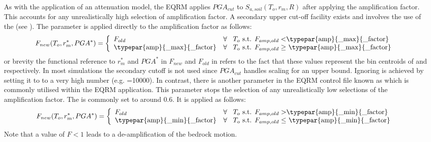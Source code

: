 As with the application of an attenuation model, the EQRM applies
$PGA_{cut}$ to $S_{a,soil}(T_o,r_m,R)$ after applying the
amplification factor. This accounts for any unrealistically high
selection of amplification factor. A secondary upper cut-off
facility exists and involves the use of the
(see ).
The  parameter is applied directly to
the amplification factor as follows:
\begin{equation}
\label{eq:regolith-maxampfactor}
F_{new}(T_o,r_m^*,PGA^*) = \left \{ \begin{array}{ll} F_{old} & \textrm{$\forall$ \hspace{0.2em} $T_o$ s.t. $F_{amp,old}<$\typepar{amp}{\_max}{\_factor}} \\
\textrm{\typepar{amp}{\_max}{\_factor}} & \textrm{$\forall$ \hspace{0.2em} $T_o$ s.t. $F_{amp,old} \geq $ \typepar{amp}{\_max}{\_factor}} \\
\end{array} \right.
\end{equation}
or brevity the functional reference to $r_m^*$ and $PGA^*$ in
$F_{new}$ and $F_{old}$ in
 refers
to the fact that these values represent the bin centroids of
 and 
respectively. In most simulations the secondary cutoff is not used
since $PGA_{cut}$ handles scaling for an upper bound. Ignoring
 is achieved by setting it to to a
very high number (e.g. =10000). In
contrast, there is another parameter in the EQRM control file known
as  which is commonly utilised within
the EQRM application. This parameter stops the selection of any
unrealistically low selections of the amplification factor. The
 is commonly set to around 0.6. It is
applied as follows:
\begin{equation}
\label{eq:regolith-minampfactor}
F_{new}(T_o,r_m^*,PGA^*) = \left \{ \begin{array}{ll} F_{old} & \textrm{$\forall$ \hspace{0.2em} $T_o$ s.t. $F_{amp,old} >$\typepar{amp}{\_min}{\_factor}} \\
\textrm{\typepar{amp}{\_min}{\_factor}} & \textrm{$\forall$ \hspace{0.2em} $T_o$ s.t. $F_{amp,old} \leq $ \typepar{amp}{\_min}{\_factor}} \\
\end{array} \right.
\end{equation}
Note that a value of \mbox{$F<1$} leads to a de-amplification of
the bedrock motion.
